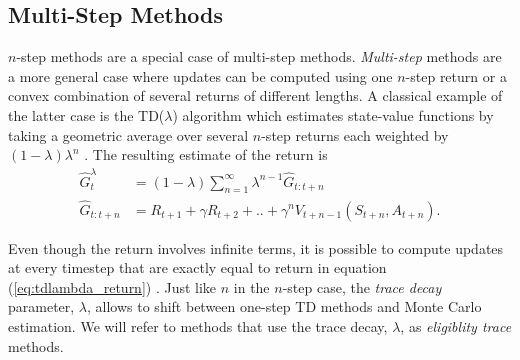 

\subsection{Multi-Step Methods}

$n$-step methods are a special case of multi-step methods.
\textit{Multi-step} methods are a more general case where updates can be computed using one $n$-step return or a convex combination of several returns of different lengths. 
A classical example of the latter case is the TD($\lambda$) algorithm which estimates state-value functions by taking a geometric average over several $n$-step returns each weighted by $(1-\lambda) \lambda^n$ \parencite{sutton1988learning}. 
The resulting estimate of the return is
\begin{align}
\label{eq:tdlambda_return}
\hat{G}^\lambda_t &= (1-\lambda) \sum^\infty_{n = 1} \lambda^{n-1} \hat{G}_{t:t+n} \\
%
\label{eq:statevalue_nstep_return}
\hat{G}_{t:t+n} &= R_{t+1} + \gamma R_{t+2} + .. + \gamma^n V_{t+n-1}(S_{t+n}, A_{t+n}).
\end{align}

Even though the return involves infinite terms, it is possible to compute updates at every timestep that are exactly equal to return in equation (\ref{eq:tdlambda_return}) \parencite{vanseijen2016}.
Just like $n$ in the $n$-step case, the \textit{trace decay} parameter, $\lambda$, allows to shift between one-step TD methods and Monte Carlo estimation.
We will refer to methods that use the trace decay, $\lambda$, as \textit{eligiblity trace} methods.

